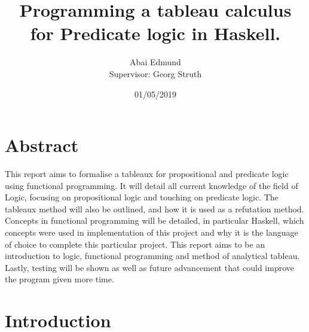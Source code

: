 \documentclass{article}%
\title{Programming a tableau calculus for Predicate logic in Haskell.}
\date{01/05/2019\\}
\author{Abai Edmund\\  Supervisor: Georg Struth}
\begin{document}
\maketitle
\newpage
\section{Abstract} 
This report aims to formalise a tableaux for propositional and predicate logic using functional programming. It will detail all current knowledge of the field of Logic, focusing on propositional logic and touching on predicate logic. The tableaux method will also be outlined, and how it is used as a refutation method. Concepts in functional programming will be detailed, in particular Haskell, which concepts were used in implementation of this project and why it is the language of choice to complete this particular project. This report aims to be an introduction to logic, functional programming and method of analytical tableau. Lastly, testing will be shown as well as future advancement that could improve the program given more time.
\newpage
\tableofcontents
\newpage
\section{Introduction}
\end{document}
